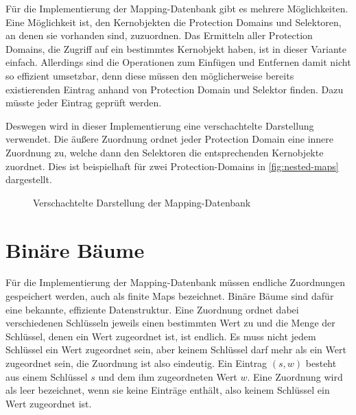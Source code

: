 \documentclass[a4paper, parskip]{scrartcl}
\begin{document}
Für die Implementierung der Mapping-Datenbank gibt es mehrere Möglichkeiten.
Eine Möglichkeit ist, den Kernobjekten die Protection Domains und Selektoren, an denen sie vorhanden sind, zuzuordnen.
Das Ermitteln aller Protection Domains, die Zugriff auf ein bestimmtes Kernobjekt haben, ist in dieser Variante einfach.
Allerdings sind die Operationen zum Einfügen und Entfernen damit nicht so effizient umsetzbar, denn diese müssen den möglicherweise bereits existierenden Eintrag anhand von Protection Domain und Selektor finden. 
Dazu müsste jeder Eintrag geprüft werden.

Deswegen wird in dieser Implementierung eine verschachtelte Darstellung verwendet.
Die äußere Zuordnung ordnet jeder Protection Domain eine innere Zuordnung zu, welche dann den Selektoren die entsprechenden Kernobjekte zuordnet.
Dies ist beispielhaft für zwei Protection-Domains in \autoref{fig:nested-maps} dargestellt.

\begin{figure}
  \centering
  \caption{Verschachtelte Darstellung der Mapping-Datenbank}
  \label{fig:nested-maps}  
\end{figure}

\section{Binäre Bäume}

Für die Implementierung der Mapping-Datenbank müssen endliche Zuordnungen gespeichert werden, auch als finite Maps bezeichnet.
Binäre Bäume sind dafür eine bekannte, effiziente Datenstruktur.
Eine Zuordnung ordnet dabei verschiedenen Schlüsseln jeweils einen bestimmten Wert zu und die Menge der Schlüssel, denen ein Wert zugeordnet ist, ist endlich. 
Es muss nicht jedem Schlüssel ein Wert zugeordnet sein, aber keinem Schlüssel darf mehr als ein Wert zugeordnet sein, die Zuordnung ist also eindeutig.
Ein Eintrag $(s, w)$ besteht aus einem Schlüssel $s$ und dem ihm zugeordneten Wert $w$. 
Eine Zuordnung wird als leer bezeichnet, wenn sie keine Einträge enthält, also keinem Schlüssel ein Wert zugeordnet ist.
\end{document}
